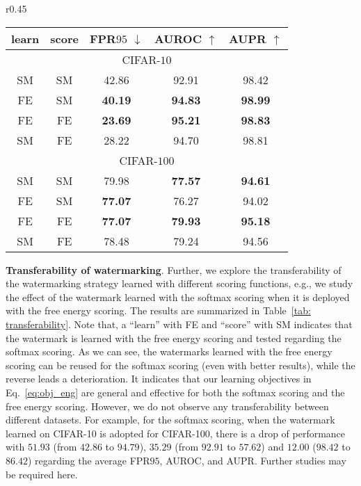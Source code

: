 \documentclass{article}
\begin{document}
\begin{wraptable}{r}{0.45\linewidth}
\centering
\caption{Transferability of watermarking across scoring functions. SM denotes softmax scoring and FE denotes free energy scoring.  } \label{tab: transferability}
\vspace{7pt}
\scriptsize{
\begin{tabular}{cc|ccc}
\toprule[1.5pt]
 learn & score & FPR$95$ $\downarrow$     & AUROC $\uparrow$       & AUPR $\uparrow$      \\
\midrule[0.6pt]
\multicolumn{5}{c}{\cellcolor{greyL}CIFAR-$10$} \\
\midrule[0.6pt]
SM & SM & 42.86 & 92.91 & 98.42 \\
FE & SM & \textbf{40.19} & \textbf{94.83} & \textbf{98.99} \\
\midrule[0.6pt]
FE & FE & \textbf{23.69} & \textbf{95.21} & \textbf{98.83} \\
SM & FE & 28.22 & 94.70 & 98.81 \\
\midrule[0.6pt]
\multicolumn{5}{c}{\cellcolor{greyL}CIFAR-$100$} \\
\midrule[0.6pt]
SM & SM & 79.98 & \textbf{77.57} & \textbf{94.61} \\
FE & SM & \textbf{77.07} & {76.27} & {94.02} \\
\midrule[0.6pt]
FE & FE & \textbf{77.07} & \textbf{79.93} & \textbf{95.18} \\
SM & FE & 78.48 & {79.24} & {94.56} \\
\bottomrule[1.5pt]      
\end{tabular}
}
\end{wraptable}



\textbf{Transferability of watermarking}. Further, we explore the transferability of the watermarking strategy learned with different scoring functions, e.g., we study the effect of the watermark learned with the softmax scoring when it is deployed with the free energy scoring. The results are summarized in Table~\ref{tab: transferability}. {Note that, a ``learn'' with FE and ``score'' with SM indicates that the watermark is learned with the free energy scoring and tested regarding the softmax scoring.} As we can see, the watermarks learned with the free energy scoring can be reused for the softmax scoring (even with better results), while the reverse leads a deterioration. It indicates that our learning objectives in Eq.~\eqref{eq:obj_eng} are general and effective for both the softmax scoring and the free energy scoring. However, we do not observe any transferability between different datasets. For example, for the softmax scoring, when the watermark learned on CIFAR-10 is adopted for CIFAR-100, there is a drop of performance with $51.93$ (from $42.86$ to $94.79$), $35.29$ (from $92.91$ to $57.62$) and $12.00$ ($98.42$ to $86.42$) regarding the average FPR$95$, AUROC, and AUPR. Further studies may be required here. 
\end{document}
